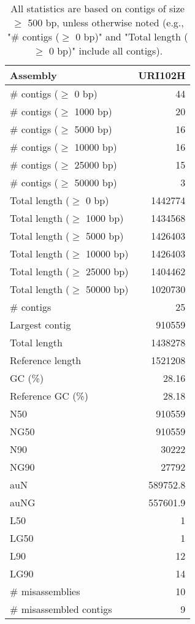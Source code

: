 \documentclass[12pt,a4paper]{article}
\begin{document}
\begin{table}[ht]
\begin{center}
\caption{All statistics are based on contigs of size $\geq$ 500 bp, unless otherwise noted (e.g., "\# contigs ($\geq$ 0 bp)" and "Total length ($\geq$ 0 bp)" include all contigs).}
\begin{tabular}{|l*{1}{|r}|}
\hline
Assembly & URI102H \\ \hline
\# contigs ($\geq$ 0 bp) & 44 \\ \hline
\# contigs ($\geq$ 1000 bp) & 20 \\ \hline
\# contigs ($\geq$ 5000 bp) & 16 \\ \hline
\# contigs ($\geq$ 10000 bp) & 16 \\ \hline
\# contigs ($\geq$ 25000 bp) & 15 \\ \hline
\# contigs ($\geq$ 50000 bp) & 3 \\ \hline
Total length ($\geq$ 0 bp) & 1442774 \\ \hline
Total length ($\geq$ 1000 bp) & 1434568 \\ \hline
Total length ($\geq$ 5000 bp) & 1426403 \\ \hline
Total length ($\geq$ 10000 bp) & 1426403 \\ \hline
Total length ($\geq$ 25000 bp) & 1404462 \\ \hline
Total length ($\geq$ 50000 bp) & 1020730 \\ \hline
\# contigs & 25 \\ \hline
Largest contig & 910559 \\ \hline
Total length & 1438278 \\ \hline
Reference length & 1521208 \\ \hline
GC (\%) & 28.16 \\ \hline
Reference GC (\%) & 28.18 \\ \hline
N50 & 910559 \\ \hline
NG50 & 910559 \\ \hline
N90 & 30222 \\ \hline
NG90 & 27792 \\ \hline
auN & 589752.8 \\ \hline
auNG & 557601.9 \\ \hline
L50 & 1 \\ \hline
LG50 & 1 \\ \hline
L90 & 12 \\ \hline
LG90 & 14 \\ \hline
\# misassemblies & 10 \\ \hline
\# misassembled contigs & 9 \\ \hline

\end{tabular}
\end{center}
\end{table}
\end{document}
